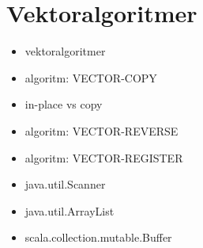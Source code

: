 \chapter{Vektoralgoritmer}\label{chapter:W05}
\begin{itemize}[nosep]
\item vektoralgoritmer
\item algoritm: VECTOR-COPY
\item in-place vs copy
\item algoritm: VECTOR-REVERSE
\item algoritm: VECTOR-REGISTER
\item java.util.Scanner
\item java.util.ArrayList
\item scala.collection.mutable.Buffer
\end{itemize}